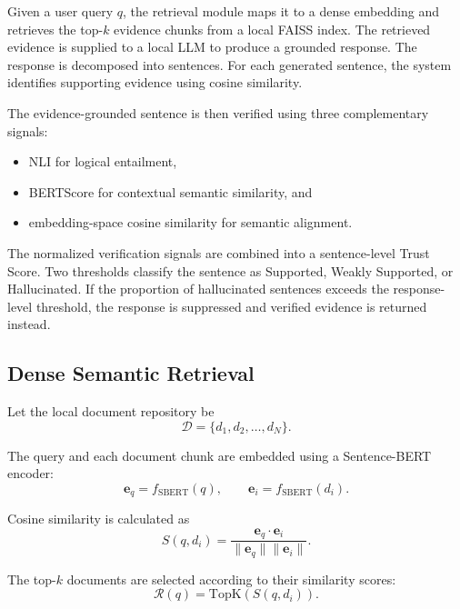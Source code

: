\documentclass[conference]{IEEEtran}
\begin{document}
Given a user query $q$, the retrieval module maps it to a dense embedding and retrieves the top-$k$ evidence chunks from a local FAISS index. The retrieved evidence is supplied to a local LLM to produce a grounded response. The response is decomposed into sentences. For each generated sentence, the system identifies supporting evidence using cosine similarity.

The evidence-grounded sentence is then verified using three complementary signals:
\begin{itemize}
    \item NLI for logical entailment,
    \item BERTScore for contextual semantic similarity, and
    \item embedding-space cosine similarity for semantic alignment.
\end{itemize}

The normalized verification signals are combined into a sentence-level Trust Score. Two thresholds classify the sentence as Supported, Weakly Supported, or Hallucinated. If the proportion of hallucinated sentences exceeds the response-level threshold, the response is suppressed and verified evidence is returned instead.

\subsection{Dense Semantic Retrieval}

Let the local document repository be
\begin{equation}
\mathcal{D}=\{d_1,d_2,\ldots,d_N\}.
\end{equation}

The query and each document chunk are embedded using a Sentence-BERT encoder:
\begin{equation}
\mathbf{e}_q=f_{\mathrm{SBERT}}(q), \qquad
\mathbf{e}_i=f_{\mathrm{SBERT}}(d_i).
\end{equation}

Cosine similarity is calculated as
\begin{equation}
S(q,d_i)=
\frac{\mathbf{e}_q\cdot\mathbf{e}_i}
{\|\mathbf{e}_q\|\|\mathbf{e}_i\|}.
\end{equation}

The top-$k$ documents are selected according to their similarity scores:
\begin{equation}
\mathcal{R}(q)=\mathrm{TopK}\left(S(q,d_i)\right).
\end{equation}
\end{document}
